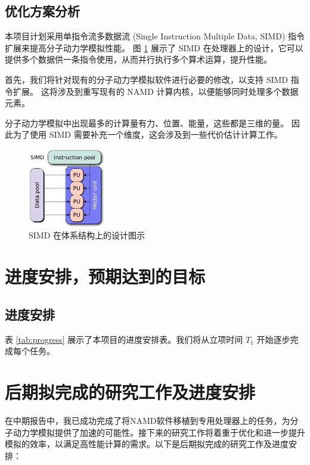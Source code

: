 \subsection{优化方案分析}

本项目计划采用单指令流多数据流 (Single Instruction Multiple Data, SIMD) 指令扩展来提高分子动力学模拟性能。
图 \ref{fig:simd} 展示了 SIMD 在处理器上的设计，它可以提供多个数据供一条指令使用，从而并行执行多个算术运算，提升性能。


首先，我们将针对现有的分子动力学模拟软件进行必要的修改，以支持 SIMD 指令扩展。
这将涉及到重写现有的 NAMD 计算内核，以便能够同时处理多个数据元素。

分子动力学模拟中出现最多的计算量有力、位置、能量，这些都是三维的量。
因此为了使用 SIMD 需要补充一个维度，这会涉及到一些代价估计计算工作。


\begin{figure}[h]
    \centering
    \includegraphics[width=0.3\textwidth]{images/SIMD2.svg.png}
    \caption{SIMD 在体系结构上的设计图示}
    \label{fig:simd}
\end{figure}

\section{进度安排，预期达到的目标}

\subsection{进度安排}

表 \ref{tab:progress} 展示了本项目的进度安排表。我们将从立项时间 $T_1$ 开始逐步完成每个任务。

\section{后期拟完成的研究工作及进度安排}

在中期报告中，我已成功完成了将NAMD软件移植到专用处理器上的任务，为分子动力学模拟提供了加速的可能性。接下来的研究工作将着重于优化和进一步提升模拟的效率，以满足高性能计算的需求。以下是后期拟完成的研究工作及进度安排：


